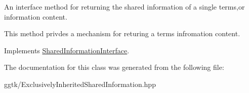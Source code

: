 An interface method for returning the shared information of a single terms,or information content. 

This method privdes a mechanism for returing a term\textquotesingle{}s infromation content. 

Implements \hyperlink{classSharedInformationInterface_aba102c0e44fbc098baef6074f1eb37b6}{Shared\+Information\+Interface}.



The documentation for this class was generated from the following file\+:\begin{DoxyCompactItemize}
\item 
ggtk/Exclusively\+Inherited\+Shared\+Information.\+hpp\end{DoxyCompactItemize}
